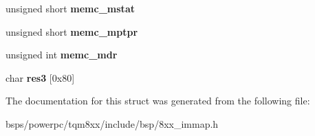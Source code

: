 \begin{DoxyCompactItemize}
\item 
\mbox{\label{structmem__ctlr_ad925c856c073b2d8469a76483b9768c6}} 
unsigned short {\bfseries memc\+\_\+mstat}
\item 
\mbox{\label{structmem__ctlr_a404ec9f4bc39425a2d04b76e6a562f49}} 
unsigned short {\bfseries memc\+\_\+mptpr}
\item 
\mbox{\label{structmem__ctlr_a07d6ccc5067a5bfb96e0a550d60a874b}} 
unsigned int {\bfseries memc\+\_\+mdr}
\item 
\mbox{\label{structmem__ctlr_ae4e0a5ce496c749871b8d58a06abb270}} 
char {\bfseries res3} \mbox{[}0x80\mbox{]}
\end{DoxyCompactItemize}


The documentation for this struct was generated from the following file\+:\begin{DoxyCompactItemize}
\item 
bsps/powerpc/tqm8xx/include/bsp/8xx\+\_\+immap.\+h\end{DoxyCompactItemize}
